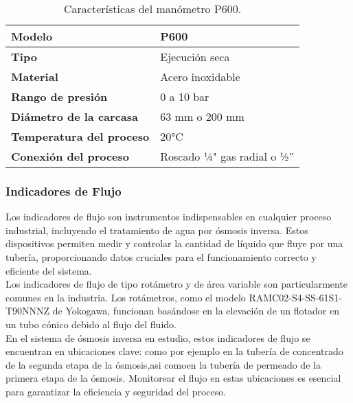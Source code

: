 

\begin{table}[H]
    \centering
    \caption{Características del manómetro P600.}
    \label{table:manometro}
    \begin{tabular}{| L{6cm} | L{6cm} |}
        
        \hline
        \textbf{Modelo} & P600  \\
        \hline
        \textbf{Tipo} & Ejecución seca  \\
        \hline
        \textbf{Material} & Acero inoxidable  \\
        \hline
        \textbf{Rango de presión} & 0 a 10 bar  \\
        \hline
        \textbf{Diámetro de la carcasa} & 63 mm o 200 mm  \\
        \hline
        \textbf{Temperatura del proceso} & 20°C  \\
        \hline
        \textbf{Conexión del proceso} & Roscado ¼" gas radial o ½''  \\
        \hline
    \end{tabular}
\end{table}


\subsubsection{Indicadores de Flujo} \label{sec:indicador_flujo}

Los indicadores de flujo son instrumentos indispensables en cualquier proceso industrial, 
incluyendo el tratamiento de agua por ósmosis inversa. Estos dispositivos permiten medir 
y controlar la cantidad de líquido que fluye por una tubería, proporcionando datos cruciales 
para el funcionamiento correcto y eficiente del sistema.\\

Los indicadores de flujo de tipo rotámetro y de área variable son particularmente comunes 
en la industria. Los rotámetros, como el modelo RAMC02-S4-SS-61S1-T90NNNZ de Yokogawa, 
funcionan basándose en la elevación de un flotador en un tubo cónico debido al flujo del 
fluido.\\

En el sistema de ósmosis inversa en estudio, estos indicadores de flujo se encuentran en 
ubicaciones clave: como por ejemplo en la tubería de concentrado 
de la segunda etapa de la ósmosis,asi comoen la tubería de permeado de la primera etapa de la ósmosis. Monitorear 
el flujo en estas ubicaciones es esencial para garantizar la eficiencia y seguridad del 
proceso.\\

